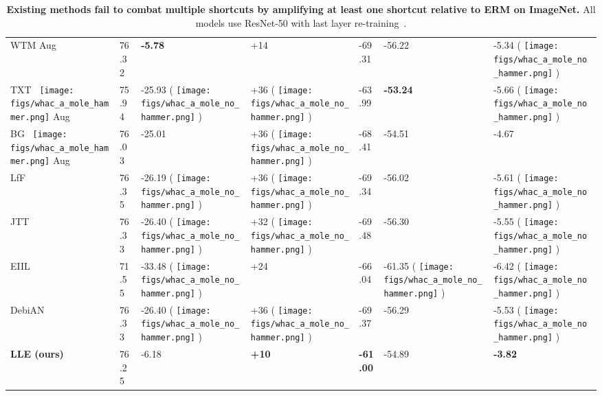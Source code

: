 \documentclass[10pt,twocolumn,letterpaper]{article}
\DeclareRobustCommand{\molehammer}{\begingroup\normalfont
  \texttt{[image: figs/whac\_a\_mole\_hammer.png]}\endgroup
}
\DeclareRobustCommand{\molenohammer}{\begingroup\normalfont
  \texttt{[image: figs/whac\_a\_mole\_no\_hammer.png]}\endgroup
}
\begin{document}
\begin{table}[t]
\begin{adjustbox}{width=\linewidth}
\begin{tabular}{@{}lllllll@{}}
WTM Aug                 & 76.32                & \textbf{-5.78}       & +14                  & -69.31               & -56.22               & -5.34   \footnotesize{(\textcolor{red}{} \molenohammer)}             \\
TXT~\molehammer Aug                  & 75.94                & -25.93 \footnotesize{(\textcolor{red}{} \molenohammer)}       & +36  \footnotesize{(\textcolor{red}{} \molenohammer)}                & -63.99               & \textbf{-53.24}               & -5.66 \footnotesize{(\textcolor{red}{} \molenohammer)}               \\
BG~\molehammer Aug                & 76.03                & -25.01               & +36 \footnotesize{(\textcolor{red}{} \molenohammer)}                 & -68.41               & -54.51               & -4.67                \\ \midrule
LfF                        & 76.35                & -26.19  \footnotesize{(\textcolor{red}{} \molenohammer)}              & +36   \footnotesize{(\textcolor{red}{} \molenohammer)}               & -69.34               & -56.02      & -5.61 \footnotesize{(\textcolor{red}{} \molenohammer)}                \\
JTT                       & 76.33                & -26.40  \footnotesize{(\textcolor{red}{} \molenohammer)}               & +32   \footnotesize{(\textcolor{red}{} \molenohammer)}               & -69.48             & -56.30      & -5.55 \footnotesize{(\textcolor{red}{} \molenohammer)}             \\
EIIL                        & 71.55                & -33.48 \footnotesize{(\textcolor{red}{} \molenohammer)}               & +24                  & -66.04               & -61.35 \footnotesize{(\textcolor{red}{} \molenohammer)}     & -6.42 \footnotesize{(\textcolor{red}{} \molenohammer)}              \\
DebiAN                     & 76.33                & -26.40  \footnotesize{(\textcolor{red}{} \molenohammer)}          & +36  \footnotesize{(\textcolor{red}{} \molenohammer)}                & -69.37               & -56.29      & -5.53 \footnotesize{(\textcolor{red}{} \molenohammer)}               \\ \midrule \midrule
\textbf{LLE (ours)}        & 76.25                & -6.18                & \textbf{+10}         & \textbf{-61.00}      & -54.89               & \textbf{-3.82}       \\ \bottomrule
\end{tabular}
\end{adjustbox}
\caption{\textbf{Existing methods fail to combat multiple shortcuts by amplifying at least one shortcut relative to ERM on ImageNet.} All models use ResNet-50 with last layer re-training~\cite{kirichenko2022Last}.}
\label{tab:imagenet_results}
\vspace{-4mm}
\end{table}
\end{document}
